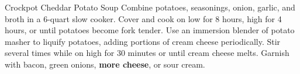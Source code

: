 \begin{recipe}{Crockpot Cheddar Potato Soup}{}{}
Combine potatoes, seasonings, onion, garlic, and broth in a 6-quart slow
cooker. Cover and cook on low for 8 hours, high for 4 hours, or until potatoes
become fork tender.
Use an immersion blender of potato masher to liquify potatoes, adding portions
of cream cheese periodically. Stir several times while on high for 30 minutes
or until cream cheese melts.
Garnish with bacon, green onions, \textbf{more cheese}, or sour cream.
\end{recipe}
